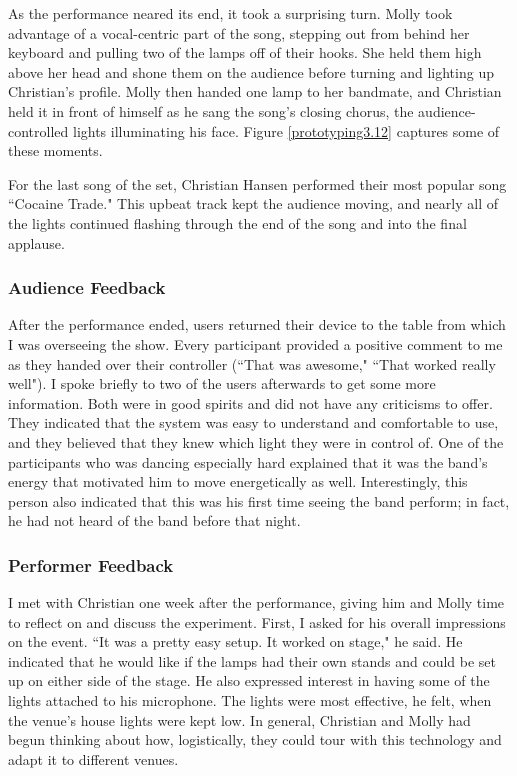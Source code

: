 As the performance neared its end, it took a surprising turn. Molly took advantage of a vocal-centric part of the song, stepping out from behind her keyboard and pulling two of the lamps off of their hooks. She held them high above her head and shone them on the audience before turning and lighting up Christian's profile. Molly then handed one lamp to her bandmate, and Christian held it in front of himself as he sang the song's closing chorus, the audience-controlled lights illuminating his face. Figure \ref{prototyping3.12} captures some of these moments.

For the last song of the set, Christian Hansen performed their most popular song ``Cocaine Trade." This upbeat track kept the audience moving, and nearly all of the lights continued flashing through the end of the song and into the final applause.

\subsubsection{Audience Feedback}

After the performance ended, users returned their device to the table from which I was overseeing the show. Every participant provided a positive comment to me as they handed over their controller (``That was awesome," ``That worked really well"). I spoke briefly to two of the users afterwards to get some more information. Both were in good spirits and did not have any criticisms to offer. They indicated that the system was easy to understand and comfortable to use, and they believed that they knew which light they were in control of. One of the participants who was dancing especially hard explained that it was the band's energy that motivated him to move energetically as well. Interestingly, this person also indicated that this was his first time seeing the band perform; in fact, he had not heard of the band before that night.

\subsubsection{Performer Feedback}

I met with Christian one week after the performance, giving him and Molly time to reflect on and discuss the experiment. First, I asked for his overall impressions on the event. ``It was a pretty easy setup. It worked on stage," he said. He indicated that he would like if the lamps had their own stands and could be set up on either side of the stage. He also expressed interest in having some of the lights attached to his microphone. The lights were most effective, he felt, when the venue's house lights were kept low. In general, Christian and Molly had begun thinking about how, logistically, they could tour with this technology and adapt it to different venues.

